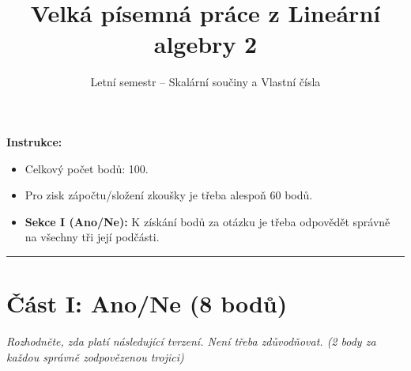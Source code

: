 \documentclass[a4paper,11pt]{article}
\title{\textbf{Velká písemná práce z Lineární algebry 2}}
\author{Letní semestr -- Skalární součiny a Vlastní čísla}
\date{}
\begin{document}
\maketitle

\noindent \textbf{Instrukce:}
\begin{itemize}
    \item Celkový počet bodů: 100.
    \item Pro zisk zápočtu/složení zkoušky je třeba alespoň 60 bodů.
    \item \textbf{Sekce I (Ano/Ne):} K získání bodů za otázku je třeba odpovědět správně na všechny tři její podčásti.
\end{itemize}

\hrule
\vspace{0.5cm}

\section*{Část I: Ano/Ne (8 bodů)}
\textit{Rozhodněte, zda platí následující tvrzení. Není třeba zdůvodňovat. (2 body za každou správně zodpovězenou trojici)}
\end{document}
